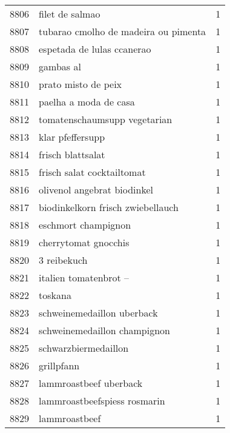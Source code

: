 \begin{tabular}{llr}
8806 &                                    filet de salmao &      1 \\
8807 &               tubarao cmolho de madeira ou pimenta &      1 \\
8808 &                         espetada de lulas ccanerao &      1 \\
8809 &                                          gambas al &      1 \\
8810 &                                prato misto de peix &      1 \\
8811 &                              paelha a moda de casa &      1 \\
8812 &                       tomatenschaumsupp vegetarian &      1 \\
8813 &                                   klar pfeffersupp &      1 \\
8814 &                                  frisch blattsalat &      1 \\
8815 &                         frisch salat cocktailtomat &      1 \\
8816 &                        olivenol angebrat biodinkel &      1 \\
8817 &                  biodinkelkorn frisch zwiebellauch &      1 \\
8818 &                                eschmort champignon &      1 \\
8819 &                               cherrytomat gnocchis &      1 \\
8820 &                                        3 reibekuch &      1 \\
8821 &                              italien tomatenbrot – &      1 \\
8822 &                                            toskana &      1 \\
8823 &                         schweinemedaillon uberback &      1 \\
8824 &                       schweinemedaillon champignon &      1 \\
8825 &                               schwarzbiermedaillon &      1 \\
8826 &                                         grillpfann &      1 \\
8827 &                             lammroastbeef uberback &      1 \\
8828 &                       lammroastbeefspiess rosmarin &      1 \\
8829 &                                      lammroastbeef &      1 \\

\end{tabular}
